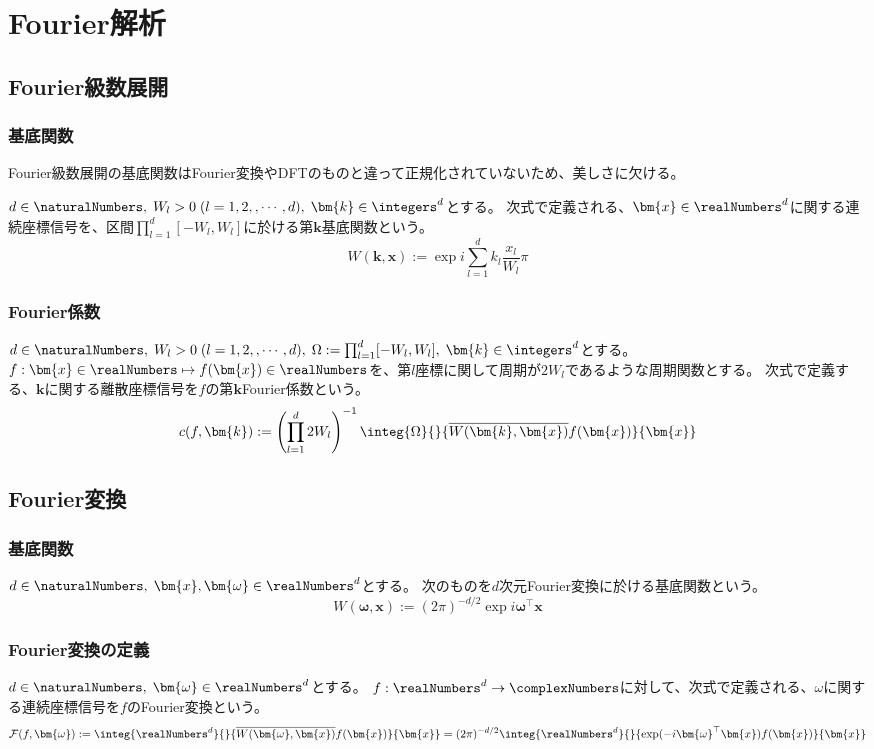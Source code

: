  \part{Fourier解析}
		\chapter{Fourier級数展開}
			\section{基底関数}
				Fourier級数展開の基底関数はFourier変換やDFTのものと違って正規化されていないため、美しさに欠ける。
				\par
				$d\in\naturalNumbers,\;W_l>0\;(l=1,2,,\cdots,d),\;\bm{k}\in\integers^d$とする。
				次式で定義される、$\bm{x}\in\realNumbers^d$に関する連続座標信号を、区間$\prod_{l=1}^d [-W_l,W_l]$に於ける第$\bm{k}$基底関数という。
				\[ W(\bm{k},\bm{x}) := \exp i\sum_{l=1}^d k_l\frac{x_l}{W_l}\pi \]

			\section{Fourier係数}
				$d\in\naturalNumbers,\;W_l>0\;(l=1,2,,\cdots,d),\;\Omega:=\prod_{l=1}^d [-W_l,W_l],\;\bm{k}\in\integers^d$とする。
				$f:\bm{x}\in\realNumbers \mapsto f(\bm{x})\in\realNumbers$を、第$l$座標に関して周期が$2W_l$であるような周期関数とする。
				次式で定義する、$\bm{k}$に関する離散座標信号を$f$の第$\bm{k}$Fourier係数という。
				\[ c(f,\bm{k}) := \left(\prod_{l=1}^d 2W_l\right)^{-1}\integ{\Omega}{}{\overline{W(\bm{k},\bm{x})}f(\bm{x})}{\bm{x}} \]

		\chapter{Fourier変換}
			\section{基底関数}
				$d\in\naturalNumbers,\;\bm{x},\bm{\omega}\in\realNumbers^d$とする。
				次のものを$d$次元Fourier変換に於ける基底関数という。
				\[ W(\bm{\omega},\bm{x}) := (2\pi)^{-d/2}\exp i\bm{\omega}^\top\bm{x} \]

			\section{Fourier変換の定義}
				$d\in\naturalNumbers,\;\bm{\omega}\in\realNumbers^d$とする。
				$f:\realNumbers^d\to\complexNumbers$に対して、次式で定義される、$\omega$に関する連続座標信号を$f$のFourier変換という。
				\[ \mathcal{F}(f,\bm{\omega}) := \integ{\realNumbers^d}{}{\overline{W(\bm{\omega},\bm{x})}f(\bm{x})}{\bm{x}} = (2\pi)^{-d/2} \integ{\realNumbers^d}{}{\exp (-i\bm{\omega}^\top\bm{x})f(\bm{x})}{\bm{x}} \]

